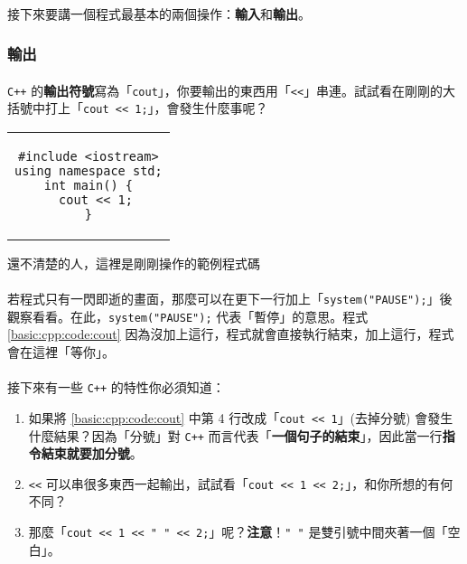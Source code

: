 \documentclass[12pt,a4paper,oneside]{article}
\begin{document}
\begin{CJK}{UTF8}{bkai}
\paragraph{}接下來要講一個程式最基本的兩個操作：\textbf{輸入}和\textbf{輸出}。

\subsubsection{輸出}

\paragraph{}\texttt{C++} 的\textbf{輸出符號}寫為「\lstinline!cout!」，你要輸出的東西用「\lstinline!<<!」串連。試試看在剛剛的大括號中打上「\lstinline!cout << 1;!」，會發生什麼事呢？

\begin{code}[h!]
\centering
\begin{tabular}{c}
\begin{lstlisting}
#include <iostream>
using namespace std;
int main() {
  cout << 1;
}
\end{lstlisting}
\end{tabular}
\caption{還不清楚的人，這裡是剛剛操作的範例程式碼}
\label{basic:cpp:code:cout}
\end{code}

\paragraph{}若程式只有一閃即逝的畫面，那麼可以在更下一行加上「\lstinline!system("PAUSE");!」後觀察看看。在此，\lstinline!system("PAUSE");! 代表「暫停」的意思。程式 \ref{basic:cpp:code:cout} 因為沒加上這行，程式就會直接執行結束，加上這行，程式會在這裡「等你」。
\paragraph{}接下來有一些 \texttt{C++} 的特性你必須知道：

\begin{enumerate}
\item 如果將 \ref{basic:cpp:code:cout} 中第 4 行改成「\lstinline!cout << 1!」(去掉分號) 會發生什麼結果？因為「分號」對 \texttt{C++} 而言代表「\textbf{一個句子的結束}」，因此當一行\textbf{指令結束就要加分號}。
\item \lstinline!<<! 可以串很多東西一起輸出，試試看「\lstinline!cout << 1 << 2;!」，和你所想的有何不同？
\item 那麼「\lstinline!cout << 1 << " " << 2;!」呢？{\color{blue}\textbf{注意}}！\lstinline!" "! 是雙引號中間夾著一個「空白」。
\end{enumerate}


\end{CJK}
\end{document}
